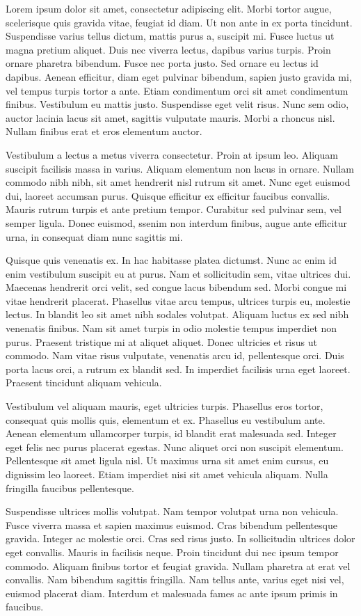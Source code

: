 Lorem ipsum dolor sit amet, consectetur adipiscing elit. Morbi tortor augue, scelerisque quis gravida vitae, feugiat id diam. Ut non ante in ex porta tincidunt. Suspendisse varius tellus dictum, mattis purus a, suscipit mi. Fusce luctus ut magna pretium aliquet. Duis nec viverra lectus, dapibus varius turpis. Proin ornare pharetra bibendum. Fusce nec porta justo. Sed ornare eu lectus id dapibus. Aenean efficitur, diam eget pulvinar bibendum, sapien justo gravida mi, vel tempus turpis tortor a ante. Etiam condimentum orci sit amet condimentum finibus. Vestibulum eu mattis justo. Suspendisse eget velit risus. Nunc sem odio, auctor lacinia lacus sit amet, sagittis vulputate mauris. Morbi a rhoncus nisl. Nullam finibus erat et eros elementum auctor.

Vestibulum a lectus a metus viverra consectetur. Proin at ipsum leo. Aliquam suscipit facilisis massa in varius. Aliquam elementum non lacus in ornare. Nullam commodo nibh nibh, sit amet hendrerit nisl rutrum sit amet. Nunc eget euismod dui, laoreet accumsan purus. Quisque efficitur ex efficitur faucibus convallis. Mauris rutrum turpis et ante pretium tempor. Curabitur sed pulvinar sem, vel semper ligula. Donec euismod, ssenim non interdum finibus, augue ante efficitur urna, in consequat diam nunc sagittis mi.

Quisque quis venenatis ex. In hac habitasse platea dictumst. Nunc ac enim id enim vestibulum suscipit eu at purus. Nam et sollicitudin sem, vitae ultrices dui. Maecenas hendrerit orci velit, sed congue lacus bibendum sed. Morbi congue mi vitae hendrerit placerat. Phasellus vitae arcu tempus, ultrices turpis eu, molestie lectus. In blandit leo sit amet nibh sodales volutpat. Aliquam luctus ex sed nibh venenatis finibus. Nam sit amet turpis in odio molestie tempus imperdiet non purus. Praesent tristique mi at aliquet aliquet. Donec ultricies et risus ut commodo. Nam vitae risus vulputate, venenatis arcu id, pellentesque orci. Duis porta lacus orci, a rutrum ex blandit sed. In imperdiet facilisis urna eget laoreet. Praesent tincidunt aliquam vehicula.

Vestibulum vel aliquam mauris, eget ultricies turpis. Phasellus eros tortor, consequat quis mollis quis, elementum et ex. Phasellus eu vestibulum ante. Aenean elementum ullamcorper turpis, id blandit erat malesuada sed. Integer eget felis nec purus placerat egestas. Nunc aliquet orci non suscipit elementum. Pellentesque sit amet ligula nisl. Ut maximus urna sit amet enim cursus, eu dignissim leo laoreet. Etiam imperdiet nisi sit amet vehicula aliquam. Nulla fringilla faucibus pellentesque.

Suspendisse ultrices mollis volutpat. Nam tempor volutpat urna non vehicula. Fusce viverra massa et sapien maximus euismod. Cras bibendum pellentesque gravida. Integer ac molestie orci. Cras sed risus justo. In sollicitudin ultrices dolor eget convallis. Mauris in facilisis neque. Proin tincidunt dui nec ipsum tempor commodo. Aliquam finibus tortor et feugiat gravida. Nullam pharetra at erat vel convallis. Nam bibendum sagittis fringilla. Nam tellus ante, varius eget nisi vel, euismod placerat diam. Interdum et malesuada fames ac ante ipsum primis in faucibus.